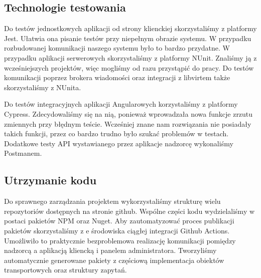 \documentclass[../opis-rozwiazania.tex]{subfiles}
\begin{document}
\subsection{Technologie testowania}
Do testów jednostkowych aplikacji od strony klienckiej skorzystaliśmy z platformy Jest.
Ułatwia ona pisanie testów przy niepełnym obrazie systemu. W przypadku rozbudowanej komunikacji naszego systemu było to bardzo przydatne.
W przypadku aplikacji serwerowych skorzystaliśmy z platformy NUnit.
Znaliśmy ją z wcześniejszych projektów, więc mogliśmy od razu przystąpić do pracy.
Do testów komunikacji poprzez brokera wiadomości oraz integracji z libvirtem także skorzystaliśmy z NUnita.

Do testów integracyjnych aplikacji Angularowych korzystaliśmy z platformy Cypress.
Zdecydowaliśmy się na nią, ponieważ wprowadzała nowa funkcje zrzutu zmiennych przy błędnym teście.
Wcześniej znane nam rozwiązania nie posiadały takich funkcji, przez co bardzo trudno było szukać problemów w testach.
Dodatkowe testy API wystawianego przez aplikacje nadzorcę wykonaliśmy Postmanem.

\subsection{Utrzymanie kodu}
Do sprawnego zarządzania projektem wykorzystaliśmy strukturę wielu repozytoriów dostępnych na stronie github.
Wspólne części kodu wydzielaliśmy w postaci pakietów NPM oraz Nuget.
Aby zautomatyzować proces publikacji pakietów skorzystaliśmy z e środowiska ciągłej integracji Github Actions.
Umożliwiło to praktycznie bezproblemowa realizację komunikacji pomiędzy nadzorcą a aplikacją kliencką i panelem administratora.
Tworzyliśmy automatycznie generowane pakiety z częściową implementacja obiektów transportowych oraz struktury zapytań.
\end{document}
